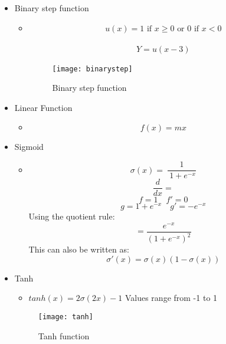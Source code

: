 \documentclass{article}
\begin{document}
\begin{itemize}
    \item Binary step function
    \begin{itemize}
        \item \begin{align*}
            u(x) = 	1 \mbox{ if }  x \geq 0 \mbox{ or } 0 \mbox{ if } x <  0
        \end{align*}


     \begin{align*}
            Y = u(x-3)
        \end{align*}
        \begin{figure}[h!]
            \centering
            \texttt{[image: binarystep]}
            \caption{Binary step function}
        \end{figure}
    \end{itemize}


    \item Linear Function
        \begin{itemize}
            \item \begin{equation*}
            f(x) = mx
        \end{equation*}
        \end{itemize}


    \item Sigmoid
        \begin{itemize}
            \item
            $$\sigma(x)  =\:\frac{1}{\:1+e^{-x}}$$
            $$\frac{d}{dx} =$$
            $$f  = 1 \quad f' = 0$$
            $$g  = 1 + e^{-x} \quad g' = -e^{-x}$$
            Using the quotient rule:
            $$= \frac{e^{-x}}{{(1+e^{-x})}^2}$$
            This can also be written as:
            $$\sigma'(x) = \sigma(x)(1-\sigma(x))$$

        \end{itemize}


    \item Tanh
        \begin{itemize}
        \item $tanh(x) = 2\sigma(2x)-1$
        \itme Values range from -1 to 1
        \end{itemize}
        \begin{figure}[h!]
            \centering
            \texttt{[image: tanh]}
            \caption{Tanh function}
        \end{figure}



\end{itemize}
\end{document}
